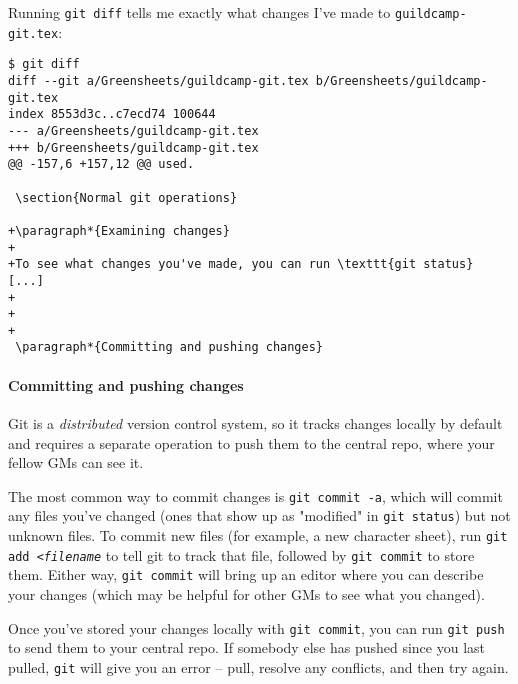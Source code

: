 \documentclass[green]{testgame}
\begin{document}
Running \texttt{git diff} tells me exactly what changes I've made to \texttt{guildcamp-git.tex}:
\begin{verbatim}
$ git diff
diff --git a/Greensheets/guildcamp-git.tex b/Greensheets/guildcamp-git.tex
index 8553d3c..c7ecd74 100644
--- a/Greensheets/guildcamp-git.tex
+++ b/Greensheets/guildcamp-git.tex
@@ -157,6 +157,12 @@ used.

 \section{Normal git operations}

+\paragraph*{Examining changes}
+
+To see what changes you've made, you can run \texttt{git status} [...]
+
+
+
 \paragraph*{Committing and pushing changes}
\end{verbatim}

\paragraph*{Committing and pushing changes}

Git is a \emph{distributed} version control system, so it tracks changes locally by default and requires a separate operation to push them to the central repo, where your fellow GMs can see it.

The most common way to commit changes is \texttt{git commit -a}, which will commit any files you've changed (ones that show up as "modified" in \texttt{git status}) but not unknown files. To commit new files (for example, a new character sheet), run \texttt{git add \emph{<filename}} to tell git to track that file, followed by \texttt{git commit} to store them. Either way, \texttt{git commit} will bring up an editor where you can describe your changes (which may be helpful for other GMs to see what you changed).

Once you've stored your changes locally with \texttt{git commit}, you can run \texttt{git push} to send them to your central repo. If somebody else has pushed since you last pulled, \texttt{git} will give you an error -- pull, resolve any conflicts, and then try again.

\end{document}
